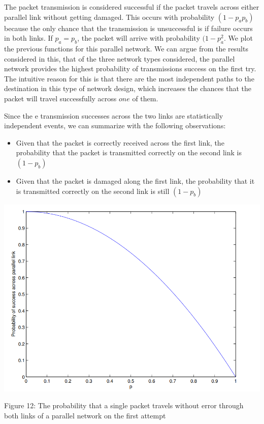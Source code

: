 \documentclass[10pt,twocolumn,letterpaper]{article}
\begin{document}
The packet transmission is considered successful if the packet travels across either parallel link without getting damaged. This occurs with probability $(1-p_a p_b)$ because the only chance that the transmission is unsuccessful is if failure occurs in both links. If $p_a=p_b$, the packet will arrive with probability $(1-p_a^2$. We plot the previous functions for this parallel network. We can argue from the results considered in this, that of the three network types considered, the parallel network provides the highest probability of transmissions success on the first try. The intuitive reason for this is that there are the most independent paths to the destination in this type of network design, which increases the chances that the packet will travel successfully across $one$ of them.

Since the e transmission successes across the two links are statistically independent events, we can summarize with the following observations: 
\begin{itemize}
    \item Given that the packet is correctly received across the first link, the probability that the packet is transmitted correctly on the second link is $(1-p_b)$
    \item Given that the packet is damaged along the first link, the probability that it is transmitted correctly on the second link is still $(1-p_b)$
\end{itemize}

\includegraphics[width=\linewidth]{plots/fig12.PNG}
\caption{Figure 12: The probability that a single packet travels without error through both links of a parallel network on the first attempt}
\end{document}
